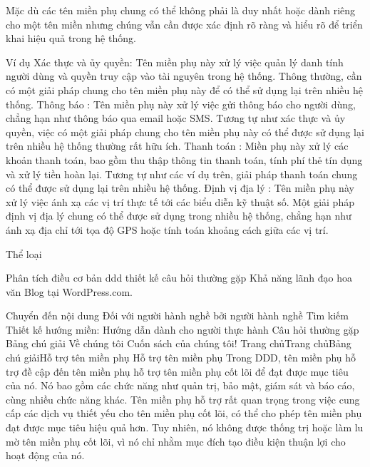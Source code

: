 Mặc dù các tên miền phụ chung có thể không phải là duy nhất hoặc dành riêng cho một tên miền nhưng chúng vẫn cần được xác định rõ ràng và hiểu rõ để triển khai hiệu quả trong hệ thống.

Ví dụ
Xác thực và ủy quyền: Tên miền phụ này xử lý việc quản lý danh tính người dùng và quyền truy cập vào tài nguyên trong hệ thống. Thông thường, cần có một giải pháp chung cho tên miền phụ này để có thể sử dụng lại trên nhiều hệ thống.
Thông báo : Tên miền phụ này xử lý việc gửi thông báo cho người dùng, chẳng hạn như thông báo qua email hoặc SMS. Tương tự như xác thực và ủy quyền, việc có một giải pháp chung cho tên miền phụ này có thể được sử dụng lại trên nhiều hệ thống thường rất hữu ích.
Thanh toán : Miền phụ này xử lý các khoản thanh toán, bao gồm thu thập thông tin thanh toán, tính phí thẻ tín dụng và xử lý tiền hoàn lại. Tương tự như các ví dụ trên, giải pháp thanh toán chung có thể được sử dụng lại trên nhiều hệ thống.
Định vị địa lý : Tên miền phụ này xử lý việc ánh xạ các vị trí thực tế tới các biểu diễn kỹ thuật số. Một giải pháp định vị địa lý chung có thể được sử dụng trong nhiều hệ thống, chẳng hạn như ánh xạ địa chỉ tới tọa độ GPS hoặc tính toán khoảng cách giữa các vị trí.

Thể loại

Phân tích
điều cơ bản
ddd
thiết kế
câu hỏi thường gặp
Khả năng lãnh đạo
hoa văn
Blog tại WordPress.com.







Chuyển đến nội dung
Đối với người hành nghề bởi người hành nghề
Tìm kiếm
Thiết kế hướng miền: Hướng dẫn dành cho người thực hành
Câu hỏi thường gặp
Bảng chú giải
Về chúng tôi
Cuốn sách của chúng tôi!
Trang chủTrang chủBảng chú giảiHỗ trợ tên miền phụ
Hỗ trợ tên miền phụ
Trong DDD, tên miền phụ hỗ trợ đề cập đến tên miền phụ hỗ trợ tên miền phụ cốt lõi để đạt được mục tiêu của nó. Nó bao gồm các chức năng như quản trị, bảo mật, giám sát và báo cáo, cùng nhiều chức năng khác. Tên miền phụ hỗ trợ rất quan trọng trong việc cung cấp các dịch vụ thiết yếu cho tên miền phụ cốt lõi, có thể cho phép tên miền phụ đạt được mục tiêu hiệu quả hơn. Tuy nhiên, nó không được thống trị hoặc làm lu mờ tên miền phụ cốt lõi, vì nó chỉ nhằm mục đích tạo điều kiện thuận lợi cho hoạt động của nó.



